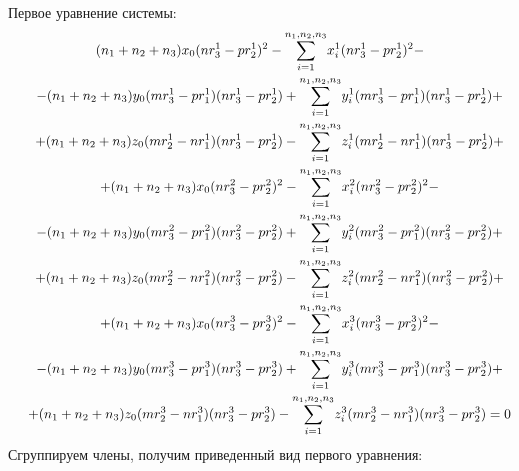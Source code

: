 Первое уравнение системы:
$$\begin{gathered}
	(n_1 + n_2 + n_3) x_0 (n r_3^1 - p r_2^1)^2 - \underset{i=1}{\overset{n_1, n_2, n_3}{\sum}} x_i^1 (n r_3^1 - p r_2^1)^2 - \\
	\hspace{0.5cm} - (n_1 + n_2 + n_3)y_0 (m r_3^1 - p r_1^1) (n r_3^1 - p r_2^1) + \underset{i=1}{\overset{n_1, n_2, n_3}{\sum}} y_i^1 (m r_3^1 - p r_1^1) (n r_3^1 - p r_2^1) + \\
	\hspace{0.5cm} + (n_1 + n_2 + n_3) z_0 (m r_2^1 - n r_1^1) (n r_3^1 - p r_2^1) - \underset{i=1}{\overset{n_1, n_2, n_3}{\sum}} z_i^1  (m r_2^1 - n r_1^1) (n r_3^1 - p r_2^1) + \\
	\hspace{0.5cm} + (n_1 + n_2 + n_3) x_0 (n r_3^2 - p r_2^2)^2 - \underset{i=1}{\overset{n_1, n_2, n_3}{\sum}} x_i^2 (n r_3^2 - p r_2^2)^2 - \\
	\hspace{0.5cm} - (n_1 + n_2 + n_3) y_0 (m r_3^2 - p r_1^2) (n r_3^2 - p r_2^2) + \underset{i=1}{\overset{n_1, n_2, n_3}{\sum}} y_i^2  (m r_3^2 - p r_1^2) (n r_3^2 - p r_2^2) + \\
	\hspace{0.5cm} + (n_1 + n_2 + n_3) z_0 (m r_2^2 - n r_1^2) (n r_3^2 - p r_2^2) - \underset{i=1}{\overset{n_1, n_2, n_3}{\sum}} z_i^2 (m r_2^2 - n r_1^2) (n r_3^2 - p r_2^2) + \\
	\hspace{0.5cm} + (n_1 + n_2 + n_3) x_0 (n r_3^3 - p r_2^3)^2 - \underset{i=1}{\overset{n_1, n_2, n_3}{\sum}} x_i^3 (n r_3^3 - p r_2^3)^2 - \\
	\hspace{0.5cm} - (n_1 + n_2 + n_3) y_0 (m r_3^3 - p r_1^3) (n r_3^3 - p r_2^3) + \underset{i=1}{\overset{n_1, n_2, n_3}{\sum}} y_i^3 (m r_3^3 - p r_1^3) (n r_3^3 - p r_2^3) + \\
	\hspace{0.5cm} + (n_1 + n_2 + n_3) z_0 (m r_2^3 - n r_1^3) (n r_3^3 - p r_2^3) - \underset{i=1}{\overset{n_1, n_2, n_3}{\sum}} z_i^3 (m r_2^3 - n r_1^3) (n r_3^3 - p r_2^3) = 0
\end{gathered}$$
Сгруппируем члены, получим приведенный вид первого уравнения:

